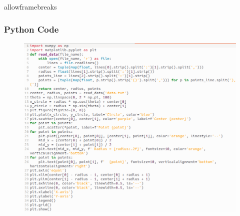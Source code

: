\documentclass{beamer}
\begin{document}
\begin{frame}{allowframebreaks}
\frametitle{Python Code}
\begin{figure}[ht]
\centering
\includegraphics[width=0.7\linewidth]{figs/Fig4.png}
\end{figure}
\end{frame}
\end{document}
